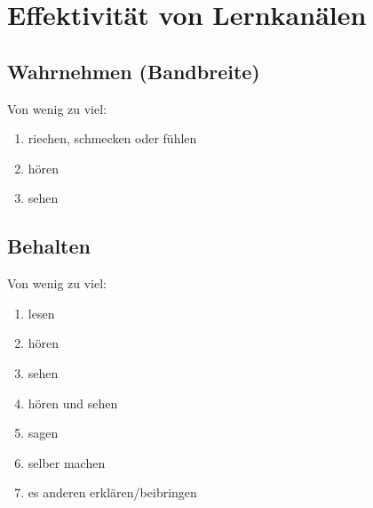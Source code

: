 \section{Effektivität von Lernkanälen}
\label{lernkanaele}

\subsection{Wahrnehmen (Bandbreite)}
Von wenig zu viel:
\begin{enumerate}
    \item riechen, schmecken oder fühlen
    \item hören
    \item sehen
\end{enumerate}

\subsection{Behalten}
Von wenig zu viel:
\begin{enumerate}
    \item lesen
    \item hören
    \item sehen
    \item hören und sehen
    \item sagen
    \item selber machen
    \item es anderen erklären/beibringen
\end{enumerate}
